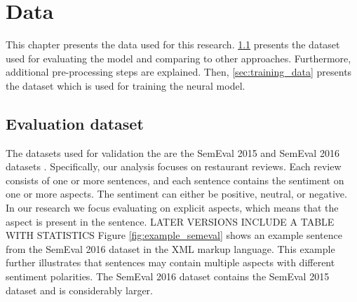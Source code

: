 \documentclass[american, oneside]{ecsgdp}
\begin{document}
\chapter{Data} \label{chap:data}
This chapter presents the data used for this research. \cref{sec:evaluation_data} presents the dataset used for evaluating the model and comparing to other approaches. Furthermore, additional pre-processing steps are explained. Then, \cref{sec:training_data} presents the dataset which is used for training the neural model.

\section{Evaluation dataset} \label{sec:evaluation_data}
The datasets used for validation the are the SemEval 2015 and SemEval 2016 datasets \parencite{Pontiki2015SemEval, Pontiki2016SemEval}. Specifically, our analysis focuses on restaurant reviews. Each review consists of one or more sentences, and each sentence contains the sentiment on one or more aspects. The sentiment can either be positive, neutral, or negative. In our research we focus evaluating on explicit aspects, which means that the aspect is present in the sentence. 
LATER VERSIONS INCLUDE A TABLE WITH STATISTICS %
Figure \ref{fig:example_semeval} shows an example sentence from the SemEval 2016 dataset in the XML markup language. This example further illustrates that sentences may contain multiple aspects with different sentiment polarities.
The SemEval 2016 dataset contains the SemEval 2015 dataset and is considerably larger. 
\end{document}
